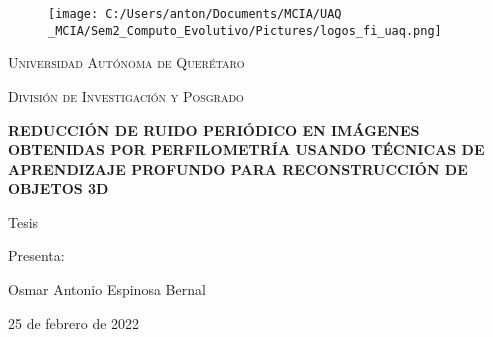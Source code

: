 \documentclass[10pt,letterpaper]{article}
\begin{document}
%

\begin{titlepage}
     \centering
	   \begin{figure}
            \begin{minipage}{1\linewidth}
            \centering\centering%
            \texttt{[image: C:/Users/anton/Documents/MCIA/UAQ \_MCIA/Sem2\_Computo\_Evolutivo/Pictures/logos\_fi\_uaq.png]}
            \end{minipage}
        \end{figure}
        
        {\scshape\LARGE Universidad Autónoma de Querétaro \par}
	        \vspace{1cm}
	        
	    {\scshape\Large División de Investigación y Posgrado \par}
	        \vspace{1cm}
	        
		{\large\bfseries REDUCCIÓN DE RUIDO PERIÓDICO EN IMÁGENES OBTENIDAS POR PERFILOMETRÍA USANDO TÉCNICAS DE APRENDIZAJE PROFUNDO PARA RECONSTRUCCIÓN DE OBJETOS 3D\par}
		    \vspace{1cm}
		    
		{\large Tesis \par}	
		    \vspace{1cm}
		    
		    
		
		Presenta:\par  \vspace{0.15cm}
		
        Osmar Antonio Espinosa Bernal
        
		\vfill
		{\large  25 de febrero de 2022\par}
\end{titlepage}


\tableofcontents
\end{document}
